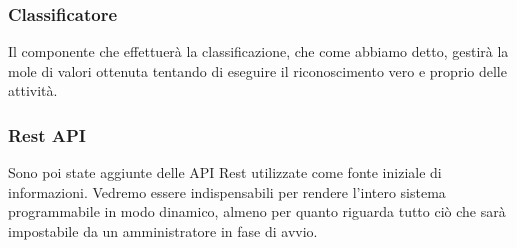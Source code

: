 \subsubsection{Classificatore}
Il componente che effettuerà la classificazione, che come abbiamo detto, gestirà la mole di valori ottenuta tentando di 
eseguire il riconoscimento vero e proprio delle attività.
\subsubsection{Rest API}
Sono poi state aggiunte delle API Rest utilizzate come fonte iniziale di informazioni. Vedremo essere indispensabili 
per rendere l'intero sistema programmabile in modo dinamico, almeno per quanto riguarda tutto ciò che sarà impostabile 
da un amministratore in fase di avvio.